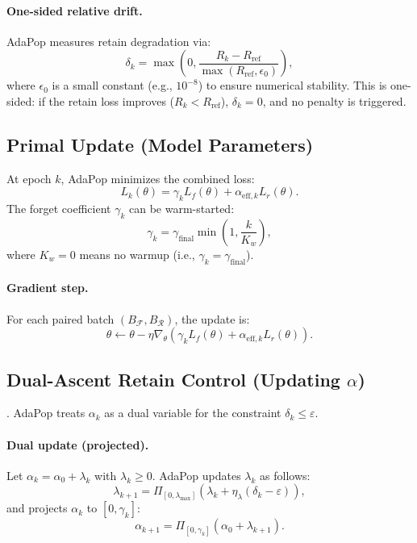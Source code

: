\paragraph{One-sided relative drift.}  
AdaPop measures retain degradation via:
\[
\delta_k = \max\left( 0, \frac{R_k - R_{\mathrm{ref}}}{\max(R_{\mathrm{ref}}, \epsilon_0)} \right),
\]
where \( \epsilon_0 \) is a small constant (e.g., \( 10^{-8} \)) to ensure numerical stability.  
This is one-sided: if the retain loss improves (\( R_k < R_{\mathrm{ref}} \)), \( \delta_k = 0 \), and no penalty is triggered.

\subsection{Primal Update (Model Parameters)}

At epoch \( k \), AdaPop minimizes the combined loss:
\[
L_k(\theta) = \gamma_k L_f(\theta) + \alpha_{\mathrm{eff},k} L_r(\theta).
\]
The forget coefficient \( \gamma_k \) can be warm-started:
\[
\gamma_k = \gamma_{\mathrm{final}} \min\left(1, \frac{k}{K_w}\right),
\]
where \( K_w = 0 \) means no warmup (i.e., \( \gamma_k = \gamma_{\mathrm{final}} \)).

\paragraph{Gradient step.}  
For each paired batch \( (B_{\mathcal{F}}, B_{\mathcal{R}}) \), the update is:
\[
\theta \leftarrow \theta - \eta \nabla_\theta \left( \gamma_k L_f(\theta) + \alpha_{\mathrm{eff},k} L_r(\theta) \right).
\]

\subsection{Dual-Ascent Retain Control (Updating $\alpha$)}

\paragraphInterpretation.
AdaPop treats \( \alpha_k \) as a dual variable for the constraint \( \delta_k \le \varepsilon \).

\paragraph{Dual update (projected).}
Let \( \alpha_k = \alpha_0 + \lambda_k \) with \( \lambda_k \ge 0 \). AdaPop updates \( \lambda_k \) as follows:
\[
\lambda_{k+1} = \Pi_{[0, \lambda_{\max}]}\left( \lambda_k + \eta_\lambda (\delta_k - \varepsilon) \right),
\]
and projects \( \alpha_k \) to \( [0, \gamma_k] \):
\[
\alpha_{k+1} = \Pi_{[0, \gamma_k]}(\alpha_0 + \lambda_{k+1}).
\]

